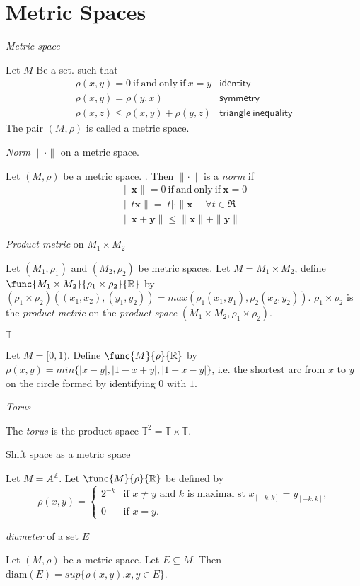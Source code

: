\section{Metric Spaces}

\begdef
\textit{Metric space}

Let $M$ Be a set.
\letfunc{M \times M}{\rho}{[0,\infty)} such that
\begin{eqnarray*}
\rho(x,y) = 0\ \mathrm{if\ and\ only\ if}\ x = y & \mathsf{identity} \\
\rho(x,y) = \rho(y,x)                       & \mathsf{symmetry} \\
\rho(x,z) \leq \rho(x,y) + \rho(y,z)        & \mathsf{triangle\ inequality}
\end{eqnarray*}
The pair $(M,\rho)$ is called a metric space.
\edefi

\begdef
\textit{Norm} $\|\cdot\|$ on a metric space.

Let $(M,\rho)$ be a metric space.
.
Then $\|\cdot\|$ is a \textit{norm} if
\begin{eqnarray*}
\|\mathbf{x}\| = 0 \ \mathrm{if\ and\ only\ if}\ \mathbf{x} = 0 \\
\|t \mathbf{x}\| = |t| \cdot \|\mathbf{x}\|\ \forall t \in \Re  \\
\|\mathbf{x} + \mathbf{y}\| \leq \|\mathbf{x}\| + \| \mathbf{y} \|
\end{eqnarray*}
\edefi

\begdef
\textit{Product metric} on $M_1 \times M_2$

Let $(M_1, \rho_1)$ and $(M_2, \rho_2)$ be metric spaces.
Let $M = M_1 \times M_2$,
define $\func{M_1 \times M_2}{\rho_1 \times \rho_2}{\mathbb{R}}$ by
$(\rho_1 \times \rho_2)((x_1, x_2), (y_1, y_2)) = max (\rho_1(x_1,y_1), \rho_2(x_2,y_2))$.
$\rho_1 \times \rho_2$ is the \textit{product metric} on
the \textit{product space} $(M_1 \times M_2, \rho_1 \times \rho_2)$.
\edefi

\begdef
$\mathbb{T}$

Let $M = [0,1)$.
Define $\func{M}{\rho}{\mathbb{R}}$ by
$\rho(x, y) = min\{ |x-y|,|1-x+y|,|1+x-y| \}$, i.e. the shortest arc from $x$
to $y$ on the circle formed by identifying $0$ with $1$.
\edefi

\begdef
\textit{Torus}

The \textit{torus} is the product space $\mathbb{T}^2 = \mathbb{T}\times\mathbb{T}$.
\edefi

\begdef
Shift space as a metric space

Let $M = A^\mathbb{Z}$.
Let $\func{M}{\rho}{\mathbb{R}}$ be defined by
\[
\rho(x,y) =
\begin{cases}
   2^{-k} & \text{if $x \neq y$ and $k$ is maximal st $x_{[-k,k]} = y_{[-k,k]}$,} \\
   0      & \text{if $x = y$.}
\end{cases}
\]

\edefi

\begdef
\textit{diameter} of a set $E$

Let $(M,\rho)$ be a metric space.
Let $E\subseteq M$.
Then $\mathrm{diam} ( E ) = sup \{ \rho ( x, y ) . x, y \in E \}$.
\edefi
